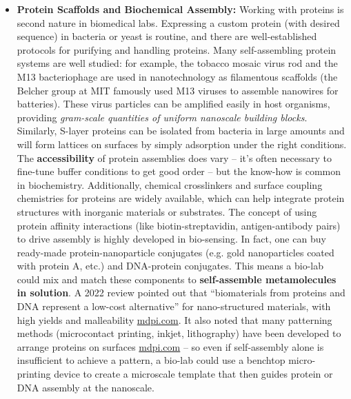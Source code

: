 \documentclass[11pt,a4paper]{article}
\begin{document}
\begin{itemize}
and then collaborate with or send samples to a materials lab for final pattern transfer -- thereby avoiding doing lithography in-house.
  \item \textbf{Protein Scaffolds and Biochemical Assembly:} Working with proteins is second nature in biomedical labs. Expressing a custom protein (with desired sequence) in bacteria or yeast is routine, and there are well-established protocols for purifying and handling proteins. Many self-assembling protein systems are well studied: for example, the tobacco mosaic virus rod and the M13 bacteriophage are used in nanotechnology as filamentous scaffolds (the Belcher group at MIT famously used M13 viruses to assemble nanowires for batteries). These virus particles can be amplified easily in host organisms, providing \emph{gram-scale quantities of uniform nanoscale building blocks}. Similarly, S-layer proteins can be isolated from bacteria in large amounts and will form lattices on surfaces by simply adsorption under the right conditions. The \textbf{accessibility} of protein assemblies does vary -- it's often necessary to fine-tune buffer conditions to get good order -- but the know-how is common in biochemistry. Additionally, chemical crosslinkers and surface coupling chemistries for proteins are widely available, which can help integrate protein structures with inorganic materials or substrates. The concept of using protein affinity interactions (like biotin-streptavidin, antigen-antibody pairs) to drive assembly is highly developed in bio-sensing. In fact, one can buy ready-made protein-nanoparticle conjugates (e.g. gold nanoparticles coated with protein A, etc.) and DNA-protein conjugates. This means a bio-lab could mix and match these components to \textbf{self-assemble metamolecules in solution}. A 2022 review pointed out that ``biomaterials from proteins and DNA represent a low-cost alternative'' for nano-structured materials, with high yields and malleability \href{https://www.mdpi.com/2079-6374/12/11/962#:~:text=from biological sources such as,materials such as composited nanoparticles}{mdpi.com}. It also noted that many patterning methods (microcontact printing, inkjet, lithography) have been developed to arrange proteins on surfaces \href{https://www.mdpi.com/2079-6374/12/11/962#:~:text=unmatched by synthetic materials ,201}{mdpi.com} -- so even if self-assembly alone is insufficient to achieve a pattern, a bio-lab could use a benchtop micro-printing device to create a microscale template that then guides protein or DNA assembly at the nanoscale.

\end{itemize}
\end{document}
